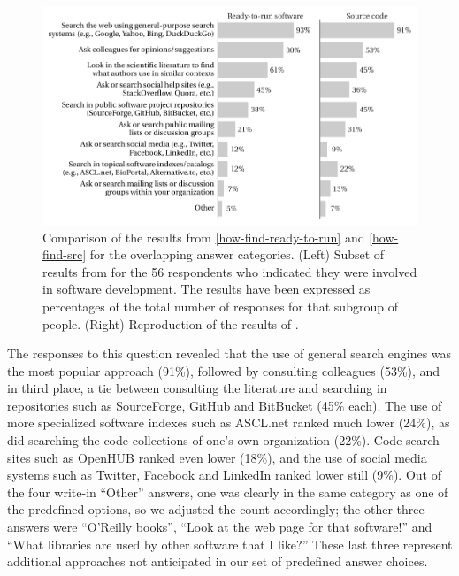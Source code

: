 \documentclass{casicswhitepaper}
\newcommand{\totalDevelopers}{56\xspace}
\begin{document}
\begin{figure}[b]
  \centering
  \includegraphics{files/plots/compare-how-find-v2.pdf}
  \vspace*{-1ex}
  \caption{Comparison of the results from \ref{how-find-ready-to-run} and \ref{how-find-src} for the overlapping answer categories. (Left) Subset of results from  for the \totalDevelopers respondents who indicated they were involved in software development.  The results have been expressed as percentages of the total number of responses for that subgroup of people.  (Right) Reproduction of the results of .}
  \label{compare-how-find}
\end{figure}


%

The responses to this question revealed that the use of general search engines was the most popular approach (91\%), followed by consulting colleagues (53\%), and in third place, a tie between consulting the literature and searching in repositories such as SourceForge, GitHub and BitBucket (45\% each).  The use of more specialized software indexes such as ASCL.net ranked much lower (24\%), as did searching the code collections of one's own organization (22\%).  Code search sites such as OpenHUB ranked even lower (18\%), and the use of social media systems such as Twitter, Facebook and LinkedIn ranked lower still (9\%).  Out of the four write-in ``Other'' answers, one was clearly in the same category as one of the predefined options, so we adjusted the count accordingly; the other three answers were ``O'Reilly books'', ``Look at the web page for that software!'' and ``What libraries are used by other software that I like?''  These last three represent additional approaches not anticipated in our set of predefined answer choices.
\end{document}
